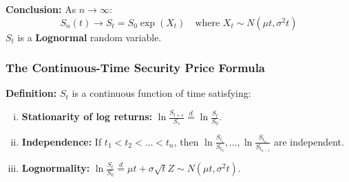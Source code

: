 \textbf{Conclusion:}
As \(n \to \infty\):
\begin{equation*}
    S_n(t) \to S_t = S_0 \exp(X_t) \quad \text{where } X_t \sim N(\mu t, \sigma^2 t)
\end{equation*}
\(S_t\) is a \textbf{Lognormal} random variable.

\subsubsection{The Continuous-Time Security Price Formula}

\textbf{Definition:} \(S_t\) is a continuous function of time satisfying:
\begin{enumerate}[i.]
    \item \textbf{Stationarity of log returns:} \(\ln \frac{S_{t+s}}{S_s} \stackrel{d}{=} \ln \frac{S_t}{S_0}\).
    \item \textbf{Independence:} If \(t_1 < t_2 < \dots < t_n\), then \(\ln \frac{S_{t_1}}{S_{t_0}}, \dots, \ln \frac{S_{t_n}}{S_{t_{n-1}}}\) are independent.
    \item \textbf{Lognormality:} \(\ln \frac{S_t}{S_0} \stackrel{d}{=} \mu t + \sigma\sqrt{t}Z \sim N(\mu t, \sigma^2 t)\).
\end{enumerate}

